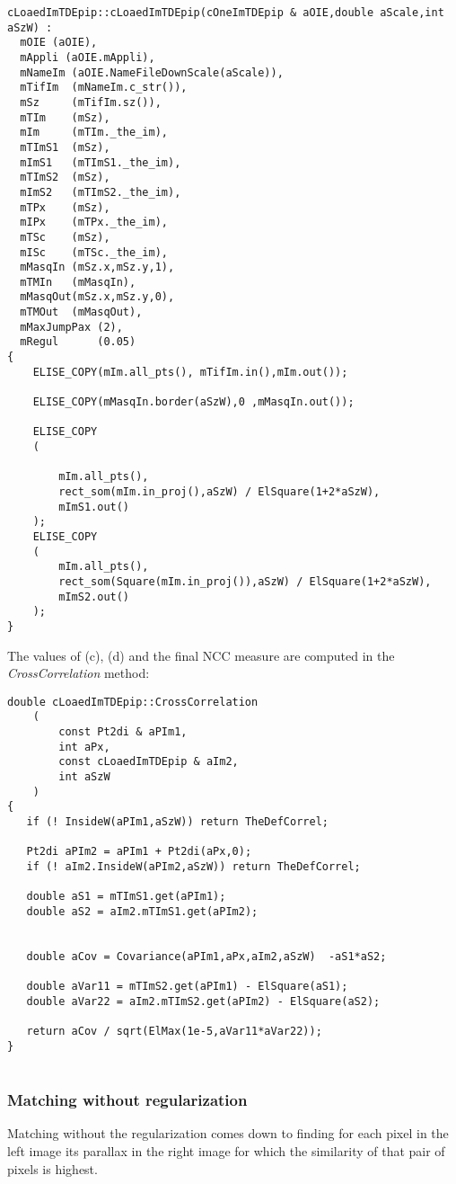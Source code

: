 \begin{lstlisting}
cLoaedImTDEpip::cLoaedImTDEpip(cOneImTDEpip & aOIE,double aScale,int aSzW) :
  mOIE (aOIE),
  mAppli (aOIE.mAppli),
  mNameIm (aOIE.NameFileDownScale(aScale)),
  mTifIm  (mNameIm.c_str()),
  mSz     (mTifIm.sz()),
  mTIm    (mSz),
  mIm     (mTIm._the_im),
  mTImS1  (mSz),
  mImS1   (mTImS1._the_im),
  mTImS2  (mSz),
  mImS2   (mTImS2._the_im),
  mTPx    (mSz),
  mIPx    (mTPx._the_im),
  mTSc    (mSz),
  mISc    (mTSc._the_im),
  mMasqIn (mSz.x,mSz.y,1),
  mTMIn   (mMasqIn),
  mMasqOut(mSz.x,mSz.y,0),
  mTMOut  (mMasqOut),
  mMaxJumpPax (2),
  mRegul      (0.05)
{
	ELISE_COPY(mIm.all_pts(), mTifIm.in(),mIm.out());

	ELISE_COPY(mMasqIn.border(aSzW),0 ,mMasqIn.out());

	ELISE_COPY
	(

	    mIm.all_pts(),
	    rect_som(mIm.in_proj(),aSzW) / ElSquare(1+2*aSzW),
	    mImS1.out()
	);
	ELISE_COPY
	(
	    mIm.all_pts(),
	    rect_som(Square(mIm.in_proj()),aSzW) / ElSquare(1+2*aSzW),
	    mImS2.out()
	);
}
\end{lstlisting}

\noindent The values of (c), (d) and the final NCC measure are computed in the \emph{CrossCorrelation} method:

\begin{lstlisting}
double cLoaedImTDEpip::CrossCorrelation
	(
	    const Pt2di & aPIm1,
	    int aPx,
	    const cLoaedImTDEpip & aIm2,
	    int aSzW
	)
{
   if (! InsideW(aPIm1,aSzW)) return TheDefCorrel;

   Pt2di aPIm2 = aPIm1 + Pt2di(aPx,0);
   if (! aIm2.InsideW(aPIm2,aSzW)) return TheDefCorrel;

   double aS1 = mTImS1.get(aPIm1);
   double aS2 = aIm2.mTImS1.get(aPIm2);


   double aCov = Covariance(aPIm1,aPx,aIm2,aSzW)  -aS1*aS2;

   double aVar11 = mTImS2.get(aPIm1) - ElSquare(aS1);
   double aVar22 = aIm2.mTImS2.get(aPIm2) - ElSquare(aS2);

   return aCov / sqrt(ElMax(1e-5,aVar11*aVar22));
}


\end{lstlisting}


\subsubsection{Matching without regularization}
Matching without the regularization comes down to finding for each pixel in the left image its parallax in the right image for which the similarity of that pair of pixels is highest.\newline

